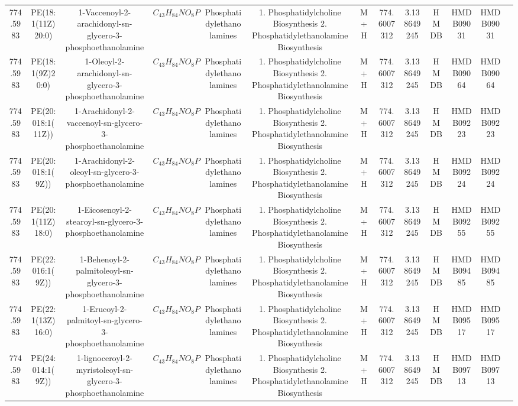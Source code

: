 \documentclass{WileyMSP-template}
\begin{document}
\begin{landscape}
\begin{table}
\begin{adjustbox}{center}
{\begin{tabular}{|c|c|c|c|c|c|c|c|c|c|c|c|c|}
            774.5983 & PE(18:1(11Z)20:0) & 1-Vaccenoyl-2-arachidonyl-sn-glycero-3-phosphoethanolamine & $ C_{43}H_{84}NO_{8}P $ & Phosphatidylethanolamines & 1. Phosphatidylcholine Biosynthesis 2. Phosphatidylethanolamine Biosynthesis & M+H & 774.6007312 & 3.138649245 & HMDB & HMDB09031 & HMDB09031\\
            774.5983 & PE(18:1(9Z)20:0) & 1-Oleoyl-2-arachidonyl-sn-glycero-3-phosphoethanolamine & $ C_{43}H_{84}NO_{8}P $ & Phosphatidylethanolamines & 1. Phosphatidylcholine Biosynthesis 2. Phosphatidylethanolamine Biosynthesis & M+H & 774.6007312 & 3.138649245 & HMDB & HMDB09064 & HMDB09064\\
            774.5983 & PE(20:018:1(11Z)) & 1-Arachidonyl-2-vaccenoyl-sn-glycero-3-phosphoethanolamine & $ C_{43}H_{84}NO_{8}P $ & Phosphatidylethanolamines & 1. Phosphatidylcholine Biosynthesis 2. Phosphatidylethanolamine Biosynthesis & M+H & 774.6007312 & 3.138649245 & HMDB & HMDB09223 & HMDB09223\\
            774.5983 & PE(20:018:1(9Z)) & 1-Arachidonyl-2-oleoyl-sn-glycero-3-phosphoethanolamine & $ C_{43}H_{84}NO_{8}P $ & Phosphatidylethanolamines & 1. Phosphatidylcholine Biosynthesis 2. Phosphatidylethanolamine Biosynthesis & M+H & 774.6007312 & 3.138649245 & HMDB & HMDB09224 & HMDB09224\\
            774.5983 & PE(20:1(11Z)18:0) & 1-Eicosenoyl-2-stearoyl-sn-glycero-3-phosphoethanolamine & $ C_{43}H_{84}NO_{8}P $ & Phosphatidylethanolamines & 1. Phosphatidylcholine Biosynthesis 2. Phosphatidylethanolamine Biosynthesis & M+H & 774.6007312 & 3.138649245 & HMDB & HMDB09255 & HMDB09255\\
            774.5983 & PE(22:016:1(9Z)) & 1-Behenoyl-2-palmitoleoyl-sn-glycero-3-phosphoethanolamine & $ C_{43}H_{84}NO_{8}P $ & Phosphatidylethanolamines & 1. Phosphatidylcholine Biosynthesis 2. Phosphatidylethanolamine Biosynthesis & M+H & 774.6007312 & 3.138649245 & HMDB & HMDB09485 & HMDB09485\\
            774.5983 & PE(22:1(13Z)16:0) & 1-Erucoyl-2-palmitoyl-sn-glycero-3-phosphoethanolamine & $ C_{43}H_{84}NO_{8}P $ & Phosphatidylethanolamines & 1. Phosphatidylcholine Biosynthesis 2. Phosphatidylethanolamine Biosynthesis & M+H & 774.6007312 & 3.138649245 & HMDB & HMDB09517 & HMDB09517\\
            774.5983 & PE(24:014:1(9Z)) & 1-lignoceroyl-2-myristoleoyl-sn-glycero-3-phosphoethanolamine & $ C_{43}H_{84}NO_{8}P $ & Phosphatidylethanolamines & 1. Phosphatidylcholine Biosynthesis 2. Phosphatidylethanolamine Biosynthesis & M+H & 774.6007312 & 3.138649245 & HMDB & HMDB09713 & HMDB09713\\

\end{tabular}}
\end{adjustbox}
\end{table}
\end{landscape}
\end{document}
